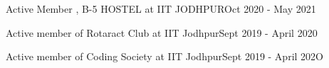 \begin{zitemize}
\item Active Member , B-5 HOSTEL at IIT JODHPUR\hfill Oct 2020 - May 2021
\item Active member of Rotaract Club at IIT Jodhpur\hfill Sept 2019 - April 2020
\item Active member of Coding Society at IIT Jodhpur\hfill Sept 2019 - April 202O
\end{zitemize} 



